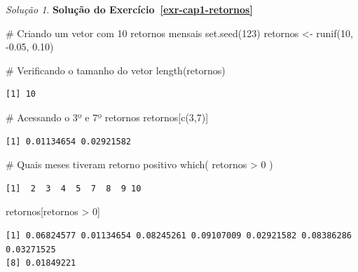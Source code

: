 \documentclass[
  portuguese,
  letterpaper,
  DIV=11,
  numbers=noendperiod]{scrreprt}
\newenvironment{Shaded}{\begin{snugshade}}{\end{snugshade}}
\newcommand{\CommentTok}[1]{\textcolor[rgb]{0.37,0.37,0.37}{#1}}
\newcommand{\DecValTok}[1]{\textcolor[rgb]{0.68,0.00,0.00}{#1}}
\newcommand{\FloatTok}[1]{\textcolor[rgb]{0.68,0.00,0.00}{#1}}
\newcommand{\FunctionTok}[1]{\textcolor[rgb]{0.28,0.35,0.67}{#1}}
\newcommand{\NormalTok}[1]{\textcolor[rgb]{0.00,0.23,0.31}{#1}}
\newcommand{\OtherTok}[1]{\textcolor[rgb]{0.00,0.23,0.31}{#1}}
\newcommand{\SpecialCharTok}[1]{\textcolor[rgb]{0.37,0.37,0.37}{#1}}
\theoremstyle{definition}
\theoremstyle{remark}
\newtheorem*{solution}{Solução}
\begin{document}
\begin{solution}
\textbf{Solução do Exercício~\ref{exr-cap1-retornos}}

\begin{Shaded}
\begin{Highlighting}[]
\CommentTok{\# Criando um vetor com 10 retornos mensais}
\FunctionTok{set.seed}\NormalTok{(}\DecValTok{123}\NormalTok{)}
\NormalTok{retornos }\OtherTok{\textless{}{-}} \FunctionTok{runif}\NormalTok{(}\DecValTok{10}\NormalTok{, }\SpecialCharTok{{-}}\FloatTok{0.05}\NormalTok{, }\FloatTok{0.10}\NormalTok{)}

\CommentTok{\# Verificando o tamanho do vetor}
\FunctionTok{length}\NormalTok{(retornos)}
\end{Highlighting}
\end{Shaded}

\begin{verbatim}
[1] 10
\end{verbatim}

\begin{Shaded}
\begin{Highlighting}[]
\CommentTok{\# Acessando o 3º e 7º retornos}
\NormalTok{retornos[}\FunctionTok{c}\NormalTok{(}\DecValTok{3}\NormalTok{,}\DecValTok{7}\NormalTok{)]}
\end{Highlighting}
\end{Shaded}

\begin{verbatim}
[1] 0.01134654 0.02921582
\end{verbatim}

\begin{Shaded}
\begin{Highlighting}[]
\CommentTok{\# Quais meses tiveram retorno positivo}
\FunctionTok{which}\NormalTok{( retornos }\SpecialCharTok{\textgreater{}} \DecValTok{0}\NormalTok{ )}
\end{Highlighting}
\end{Shaded}

\begin{verbatim}
[1]  2  3  4  5  7  8  9 10
\end{verbatim}

\begin{Shaded}
\begin{Highlighting}[]
\NormalTok{retornos[retornos }\SpecialCharTok{\textgreater{}} \DecValTok{0}\NormalTok{]}
\end{Highlighting}
\end{Shaded}

\begin{verbatim}
[1] 0.06824577 0.01134654 0.08245261 0.09107009 0.02921582 0.08386286 0.03271525
[8] 0.01849221
\end{verbatim}


\end{solution}
\end{document}
